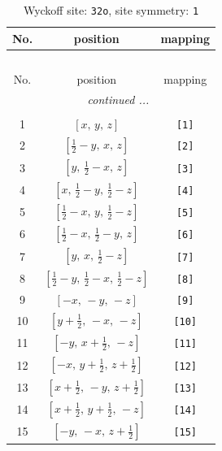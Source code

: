 \documentclass[fleqn,8pt]{jsarticle}
\begin{document}
\renewcommand{\arraystretch}{1.2}
\begin{longtable}{ccc}
\caption{Wyckoff site: {\tt 32o}, site symmetry: {\tt 1}}
 \\
 \hline \hline
No. & position & mapping \\ \hline \endfirsthead

\multicolumn{2}{l}{\tablename\ \thetable{}} \\
 \hline \hline
No. & position & mapping \\ \hline \endhead

 \hline \hline
\multicolumn{2}{r}{\footnotesize\it continued ...} \\ \endfoot

 \hline \hline
\multicolumn{2}{r}{} \\ \endlastfoot

1 & $\left[ x,\, y,\, z \right]$ & {\tt [1]} \\ \hline
2 & $\left[ \frac{1}{2} - y,\, x,\, z \right]$ & {\tt [2]} \\ \hline
3 & $\left[ y,\, \frac{1}{2} - x,\, z \right]$ & {\tt [3]} \\ \hline
4 & $\left[ x,\, \frac{1}{2} - y,\, \frac{1}{2} - z \right]$ & {\tt [4]} \\ \hline
5 & $\left[ \frac{1}{2} - x,\, y,\, \frac{1}{2} - z \right]$ & {\tt [5]} \\ \hline
6 & $\left[ \frac{1}{2} - x,\, \frac{1}{2} - y,\, z \right]$ & {\tt [6]} \\ \hline
7 & $\left[ y,\, x,\, \frac{1}{2} - z \right]$ & {\tt [7]} \\ \hline
8 & $\left[ \frac{1}{2} - y,\, \frac{1}{2} - x,\, \frac{1}{2} - z \right]$ & {\tt [8]} \\ \hline
9 & $\left[ - x,\, - y,\, - z \right]$ & {\tt [9]} \\ \hline
10 & $\left[ y + \frac{1}{2},\, - x,\, - z \right]$ & {\tt [10]} \\ \hline
11 & $\left[ - y,\, x + \frac{1}{2},\, - z \right]$ & {\tt [11]} \\ \hline
12 & $\left[ - x,\, y + \frac{1}{2},\, z + \frac{1}{2} \right]$ & {\tt [12]} \\ \hline
13 & $\left[ x + \frac{1}{2},\, - y,\, z + \frac{1}{2} \right]$ & {\tt [13]} \\ \hline
14 & $\left[ x + \frac{1}{2},\, y + \frac{1}{2},\, - z \right]$ & {\tt [14]} \\ \hline
15 & $\left[ - y,\, - x,\, z + \frac{1}{2} \right]$ & {\tt [15]} \\ \hline

\end{longtable}
\end{document}
